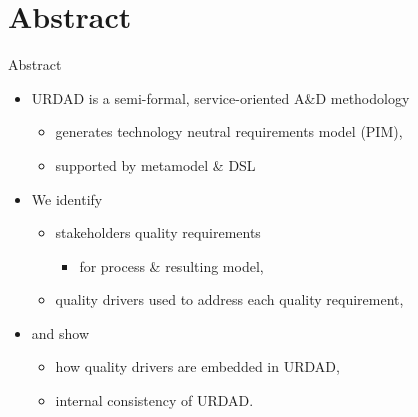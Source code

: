 \section{Abstract}

\begin{frame}{Abstract}
\initclock

  \begin{itemize}
   \item<+-| alert@+> URDAD is a semi-formal, service-oriented A\&D methodology 
      \begin{itemize}
	\item generates technology neutral requirements model (PIM),
	\item supported by metamodel \& DSL
      \end{itemize}
    \item<+-| alert@+> We identify
    \begin{itemize}
    \item stakeholders quality requirements 
	\begin{itemize}
	  \item for process \& resulting model,
	\end{itemize}
    \item quality drivers used to address each quality requirement,
    \end{itemize}
      \item<+-| alert@+> and show
      \begin{itemize}
	\item how quality drivers are embedded in URDAD,
	\item internal consistency of URDAD.
      \end{itemize}
  \end{itemize}

\end{frame}
